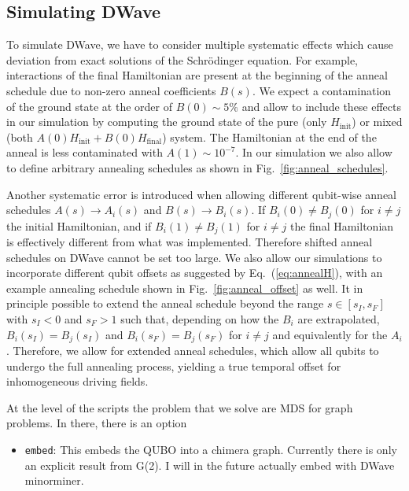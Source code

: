 \documentclass[]{article}
\begin{document}
\subsection{Simulating DWave}
To simulate DWave, we have to consider multiple systematic effects which cause deviation from exact solutions of the Schrödinger equation.
For example, interactions of the final Hamiltonian are present at the beginning of the anneal schedule due to non-zero anneal coefficients $B(s)$.
We expect a contamination of the ground state at the order of $B(0) \sim 5\%$ and allow to include these effects in our simulation by computing the ground state of the pure (only $H_\mathrm{init}$) or mixed (both $A(0) H_\mathrm{init} + B(0) H_\mathrm{final}$) system.
The Hamiltonian at the end of the anneal is less contaminated with $A(1) \sim 10^{-7}$.
In our simulation we also allow to define arbitrary annealing schedules as shown in Fig.~\ref{fig:anneal_schedules}.

Another systematic error is introduced when allowing different qubit-wise anneal schedules $A(s) \to A_i(s)$ and $B(s) \to B_i(s)$.
If $B_i(0) \neq B_j(0)$ for $i \neq j$ the initial Hamiltonian, and if $B_i(1) \neq B_j(1)$ for $i \neq j$ the final Hamiltonian is effectively different from what was implemented.
Therefore shifted anneal schedules on DWave cannot be set too large. We also allow our simulations to incorporate different qubit offsets as suggested by Eq.~(\ref{eq:annealH}), with an example annealing schedule shown in Fig.~\ref{fig:anneal_offset} as well.
It in principle possible to extend the anneal schedule beyond the range $s \in [s_I, s_F]$ with $s_I < 0$ and $s_F > 1$ such that, depending on how the $B_i$ are extrapolated, $B_i(s_I) = B_j(s_I)$ and $B_i(s_F) = B_j(s_F)$ for $i \neq j$ and equivalently for the $A_i$.
Therefore, we allow for extended anneal schedules, which allow all qubits to undergo the full annealing process, yielding a true temporal offset for inhomogeneous driving fields.

At the level of the scripts the problem that we solve are MDS for graph problems. In there, there is an option
\begin{itemize}
	\item \texttt{embed}: This embeds the QUBO into a chimera graph. Currently there is only an explicit result from G(2). I will in the future actually embed with DWave minorminer.
\end{itemize}
\end{document}
